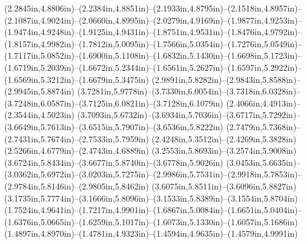 (2.2845in,4.8806in)--(2.2384in,4.8851in)--(2.1933in,4.8795in)--(2.1518in,4.8957in)--(2.1087in,4.9024in)--(2.0660in,4.8995in)--(2.0279in,4.9169in)--(1.9877in,4.9253in)--(1.9474in,4.9248in)--(1.9125in,4.9431in)--(1.8751in,4.9531in)--(1.8476in,4.9792in)--(1.8157in,4.9982in)--(1.7812in,5.0095in)--(1.7566in,5.0354in)--(1.7276in,5.0549in)--(1.7117in,5.0852in)--(1.6900in,5.1108in)--(1.6832in,5.1430in)--(1.6698in,5.1723in)--(1.6719in,5.2039in)--(1.6672in,5.2344in)--(1.6561in,5.2627in)--(1.6597in,5.2922in)--(1.6569in,5.3212in)--(1.6679in,5.3475in) (2.9891in,5.8282in)--(2.9843in,5.8588in)--(2.9945in,5.8874in) (3.7281in,5.9778in)--(3.7330in,6.0054in)--(3.7318in,6.0328in)--(3.7248in,6.0587in)--(3.7125in,6.0821in)--(3.7128in,6.1079in) (2.4066in,4.4913in)--(2.3544in,4.5023in) (3.7093in,5.6732in)--(3.6934in,5.7036in)--(3.6717in,5.7292in)--(3.6649in,5.7613in)--(3.6515in,5.7907in)--(3.6536in,5.8222in) (2.7479in,5.7368in)--(2.7431in,5.7674in)--(2.7533in,5.7959in) (2.4248in,5.3512in)--(2.4269in,5.3828in) (2.5266in,4.6779in)--(2.4743in,4.6889in) (3.2553in,5.8693in)--(3.2574in,5.9008in) (3.6724in,5.8434in)--(3.6677in,5.8740in)--(3.6778in,5.9026in) (3.0453in,5.6635in)--(3.0362in,5.6972in)--(3.0203in,5.7275in)--(2.9986in,5.7531in)--(2.9918in,5.7853in)--(2.9784in,5.8146in)--(2.9805in,5.8462in) (3.6075in,5.8511in)--(3.6096in,5.8827in) (3.1735in,5.7774in)--(3.1666in,5.8096in)--(3.1533in,5.8389in)--(3.1554in,5.8704in) (1.7524in,4.9641in)--(1.7217in,4.9901in)--(1.6867in,5.0084in)--(1.6651in,5.0404in)--(1.6376in,5.0665in)--(1.6259in,5.1017in)--(1.6073in,5.1330in)--(1.6057in,5.1686in) (1.4897in,4.8970in)--(1.4781in,4.9323in)--(1.4594in,4.9635in)--(1.4579in,4.9991in)
